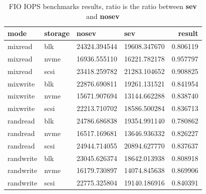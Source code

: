 \documentclass[twocolumn]{article}
\begin{document}
\begin{table}
    \small
    \begin{tabular}{llllr}
        \hline
        \textbf{mode} & \textbf{storage} &  \textbf{nosev} & \textbf{sev} & \textbf{result} \\
        \hline
        mixread       & blk              & 24324.394544    & 19608.347670 & 0.806119        \\
        mixread       & nvme             & 16936.555110    & 16221.782178 & 0.957797        \\
        mixread       & scsi             & 23418.259782    & 21283.104652 & 0.908825        \\
        mixwrite      & blk              & 22876.690811    & 19261.131521 & 0.841954        \\
        mixwrite      & nvme             & 15671.907694    & 13144.662288 & 0.838740        \\
        mixwrite      & scsi             & 22213.710702    & 18586.500284 & 0.836713        \\
        randread      & blk              & 24786.686838    & 19354.991140 & 0.780862        \\
        randread      & nvme             & 16517.169681    & 13646.936332 & 0.826227        \\
        randread      & scsi             & 24944.714055    & 20894.627770 & 0.837637        \\
        randwrite     & blk              & 23045.626374    & 18642.013938 & 0.808918        \\
        randwrite     & nvme             & 16179.730897    & 14074.845638 & 0.869906        \\
        randwrite     & scsi             & 22775.325804    & 19140.186916 & 0.840391        \\
        \hline
    \end{tabular}
    \caption{FIO IOPS benchmarks results, ratio is the ratio between \textbf{sev} and \textbf{nosev}}
    \label{tab:fio-iops-ratios}
\end{table}
\end{document}
